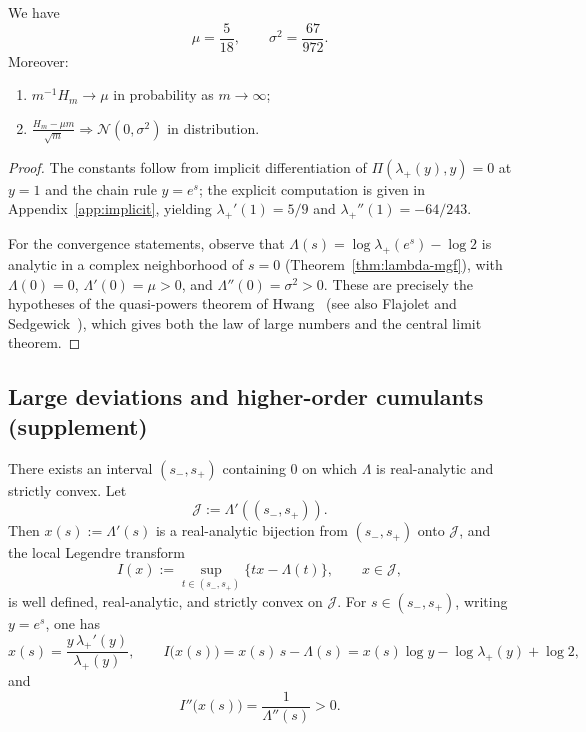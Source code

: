 \begin{theorem}\label{thm:lln-clt}
We have
\[
\mu=\frac{5}{18},\qquad \sigma^2=\frac{67}{972}.
\]
Moreover:
\begin{enumerate}
  \item $m^{-1}H_m\to \mu$ in probability as $m\to\infty$;
  \item $\displaystyle \frac{H_m-\mu m}{\sqrt{m}}\Rightarrow \mathcal{N}(0,\sigma^2)$ in distribution.
\end{enumerate}
\end{theorem}

\begin{proof}
The constants follow from implicit differentiation of $\Pi(\lambda_+(y),y)=0$ at $y=1$ and the chain rule $y=e^s$; the explicit computation is given in Appendix~\ref{app:implicit}, yielding $\lambda_+'(1)=5/9$ and $\lambda_+''(1)=-64/243$.

For the convergence statements, observe that $\Lambda(s)=\log\lambda_+(e^s)-\log 2$ is analytic in a complex neighborhood of $s=0$ (Theorem~\ref{thm:lambda-mgf}), with $\Lambda(0)=0$, $\Lambda'(0)=\mu>0$, and $\Lambda''(0)=\sigma^2>0$.
These are precisely the hypotheses of the quasi-powers theorem of Hwang~\cite{Hwang1998} (see also Flajolet and Sedgewick~\cite[Chapter~IX, Theorem~IX.8]{FlajoletSedgewick2009}), which gives both the law of large numbers and the central limit theorem.
\end{proof}

\subsection{Large deviations and higher-order cumulants (supplement)}

\begin{proposition}\label{prop:local-rate-function}
There exists an interval \((s_-,s_+)\) containing \(0\) on which \(\Lambda\) is real-analytic and strictly convex.
Let
\[
\mathcal J:=\Lambda'((s_-,s_+)).
\]
Then \(x(s):=\Lambda'(s)\) is a real-analytic bijection from \((s_-,s_+)\) onto \(\mathcal J\), and the local Legendre transform
\[
I(x):=\sup_{t\in(s_-,s_+)}\{tx-\Lambda(t)\},\qquad x\in\mathcal J,
\]
is well defined, real-analytic, and strictly convex on \(\mathcal J\).
For \(s\in(s_-,s_+)\), writing \(y=e^s\), one has
\[
x(s)=\frac{y\,\lambda_+'(y)}{\lambda_+(y)},
\qquad
I\!\bigl(x(s)\bigr)=x(s)\,s-\Lambda(s)=x(s)\log y-\log\lambda_+(y)+\log2,
\]
and
\[
I''\!\bigl(x(s)\bigr)=\frac{1}{\Lambda''(s)}>0.
\]
\end{proposition}

